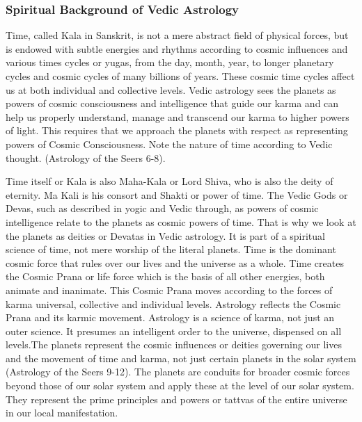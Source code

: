  

\subsubsection{Spiritual Background of Vedic Astrology}
 

Time, called Kala in Sanskrit, is not a mere abstract field of physical forces, but is endowed with subtle energies and rhythms according to cosmic influences and various times cycles or yugas, from the day, month, year, to longer planetary cycles and cosmic cycles of many billions of years. These cosmic time cycles affect us at both individual and collective levels. Vedic astrology sees the planets as powers of cosmic consciousness and intelligence that guide our karma and can help us properly understand, manage and transcend our karma to higher powers of light. This requires that we approach the planets with respect as representing powers of Cosmic Consciousness. Note the nature of time according to Vedic thought. (Astrology of the Seers 6-8).

 

Time itself or Kala is also Maha-Kala or Lord Shiva, who is also the deity of eternity. Ma Kali is his consort and Shakti or power of time. The Vedic Gods or Devas, such as described in yogic and Vedic through, as powers of cosmic intelligence relate to the planets as cosmic powers of time. That is why we look at the planets as deities or Devatas in Vedic astrology. It is part of a spiritual science of time, not mere worship of the literal planets. Time is the dominant cosmic force that rules over our lives and the universe as a whole. Time creates the Cosmic Prana or life force which is the basis of all other energies, both animate and inanimate. This Cosmic Prana moves according to the forces of karma universal, collective and individual levels. Astrology reflects the Cosmic Prana and its karmic movement.  Astrology is a science of karma, not just an outer science. It presumes an intelligent order to the universe, dispensed on all levels.The planets represent the cosmic influences or deities governing our lives and the movement of time and karma, not just certain planets in the solar system (Astrology of the Seers 9-12). The planets are conduits for broader cosmic forces beyond those of our solar system and apply these at the level of our solar system. They represent the prime principles and powers or tattvas of the entire universe in our local manifestation.

 

